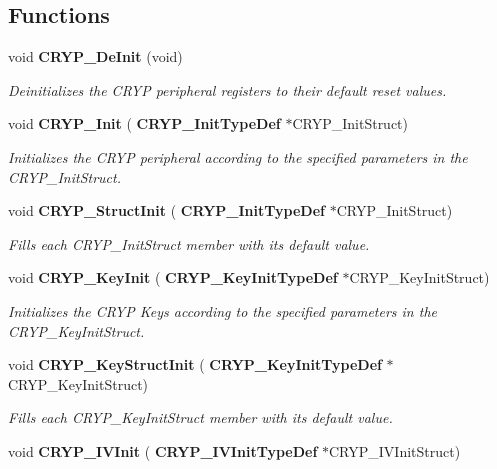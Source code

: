 \subsection*{Functions}
\begin{DoxyCompactItemize}
\item 
void \textbf{ C\+R\+Y\+P\+\_\+\+De\+Init} (void)
\begin{DoxyCompactList}\small\item\em Deinitializes the C\+R\+YP peripheral registers to their default reset values. \end{DoxyCompactList}\item 
void \textbf{ C\+R\+Y\+P\+\_\+\+Init} (\textbf{ C\+R\+Y\+P\+\_\+\+Init\+Type\+Def} $\ast$C\+R\+Y\+P\+\_\+\+Init\+Struct)
\begin{DoxyCompactList}\small\item\em Initializes the C\+R\+YP peripheral according to the specified parameters in the C\+R\+Y\+P\+\_\+\+Init\+Struct. \end{DoxyCompactList}\item 
void \textbf{ C\+R\+Y\+P\+\_\+\+Struct\+Init} (\textbf{ C\+R\+Y\+P\+\_\+\+Init\+Type\+Def} $\ast$C\+R\+Y\+P\+\_\+\+Init\+Struct)
\begin{DoxyCompactList}\small\item\em Fills each C\+R\+Y\+P\+\_\+\+Init\+Struct member with its default value. \end{DoxyCompactList}\item 
void \textbf{ C\+R\+Y\+P\+\_\+\+Key\+Init} (\textbf{ C\+R\+Y\+P\+\_\+\+Key\+Init\+Type\+Def} $\ast$C\+R\+Y\+P\+\_\+\+Key\+Init\+Struct)
\begin{DoxyCompactList}\small\item\em Initializes the C\+R\+YP Keys according to the specified parameters in the C\+R\+Y\+P\+\_\+\+Key\+Init\+Struct. \end{DoxyCompactList}\item 
void \textbf{ C\+R\+Y\+P\+\_\+\+Key\+Struct\+Init} (\textbf{ C\+R\+Y\+P\+\_\+\+Key\+Init\+Type\+Def} $\ast$C\+R\+Y\+P\+\_\+\+Key\+Init\+Struct)
\begin{DoxyCompactList}\small\item\em Fills each C\+R\+Y\+P\+\_\+\+Key\+Init\+Struct member with its default value. \end{DoxyCompactList}\item 
void \textbf{ C\+R\+Y\+P\+\_\+\+I\+V\+Init} (\textbf{ C\+R\+Y\+P\+\_\+\+I\+V\+Init\+Type\+Def} $\ast$C\+R\+Y\+P\+\_\+\+I\+V\+Init\+Struct)

\end{DoxyCompactItemize}
